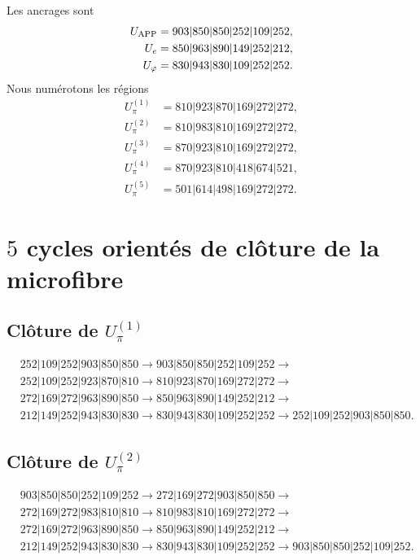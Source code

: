 Les ancrages sont
\[
\begin{aligned}
U_{\rm APP}&=903|850|850|252|109|252,\\
U_e&=850|963|890|149|252|212,\\
U_\varphi&=830|943|830|109|252|252.
\end{aligned}
\]
Nous numérotons les régions
\[
\begin{aligned}
U_\pi^{(1)}&=810|923|870|169|272|272,\\
U_\pi^{(2)}&=810|983|810|169|272|272,\\
U_\pi^{(3)}&=870|923|810|169|272|272,\\
U_\pi^{(4)}&=870|923|810|418|674|521,\\
U_\pi^{(5)}&=501|614|498|169|272|272.
\end{aligned}
\]

\section{\(5\) cycles orientés de clôture de la microfibre}

\subsection{Clôture de \texorpdfstring{\(U_\pi^{(1)}\)}{U-pi 1}}
\begin{align*}
&252|109|252|903|850|850\to
903|850|850|252|109|252\to\\
&252|109|252|923|870|810\to
810|923|870|169|272|272\to\\
&272|169|272|963|890|850\to
850|963|890|149|252|212\to\\
&212|149|252|943|830|830\to
830|943|830|109|252|252\to
252|109|252|903|850|850.
\end{align*}

\subsection{Clôture de \texorpdfstring{\(U_\pi^{(2)}\)}{U-pi 2}}
\begin{align*}
&903|850|850|252|109|252\to
272|169|272|903|850|850\to\\
&272|169|272|983|810|810\to
810|983|810|169|272|272\to\\
&272|169|272|963|890|850\to
850|963|890|149|252|212\to\\
&212|149|252|943|830|830\to
830|943|830|109|252|252\to
903|850|850|252|109|252.
\end{align*}

